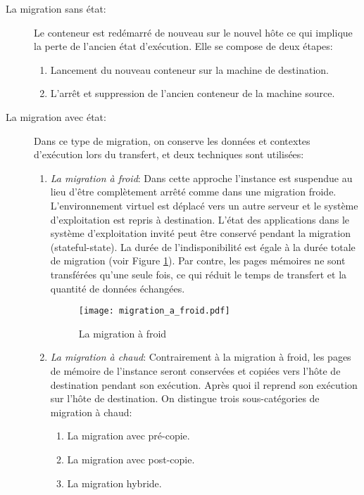 \begin{description}
  \item[La migration sans état:] Le conteneur est redémarré de nouveau sur le nouvel hôte ce qui implique la perte de l'ancien état d'exécution. Elle se compose de deux étapes:
  \begin{enumerate}
    \item Lancement du nouveau conteneur sur la machine de destination.
    \item L'arrêt et suppression de l'ancien conteneur de la machine source.
  \end{enumerate}
  \item[La migration avec état:] Dans ce type de migration, on conserve les données et contextes d'exécution lors du transfert, et deux techniques sont utilisées:
    \begin{enumerate}
      \item \emph{La migration à froid}: Dans cette approche l'instance est suspendue au lieu d'être complètement arrêté comme dans une migration froide. L'environnement virtuel est déplacé vers un autre serveur et le système d'exploitation est repris à destination. L'état des applications dans le système d'exploitation invité peut être conservé pendant la migration (stateful-state). La durée de l'indisponibilité est égale à la durée totale de migration (voir Figure \ref{fig:migration_a_froid}). Par contre, les pages mémoires ne sont transférées qu'une seule fois, ce qui réduit le temps de transfert et la quantité de données échangées.
      \begin{figure}[H]
      \centering
      \texttt{[image: migration\_a\_froid.pdf]}
      \caption{La migration à froid \cite{puliafito2019}}
      \label{fig:migration_a_froid}
      \end{figure}
      \item \emph{La migration à chaud}: Contrairement à la migration à froid, les pages de mémoire de l'instance seront conservées et copiées vers l'hôte de destination pendant son exécution. Après quoi il reprend son exécution sur l'hôte de destination. On distingue trois sous-catégories de migration à chaud:
        \begin{enumerate}
          \item La migration avec pré-copie.
          \item La migration avec post-copie.
          \item La migration hybride.
        \end{enumerate}
      \end{enumerate}
\end{description}
